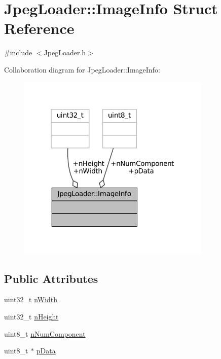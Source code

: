 \hypertarget{structJpegLoader_1_1ImageInfo}{}\section{Jpeg\+Loader\+::Image\+Info Struct Reference}
\label{structJpegLoader_1_1ImageInfo}


{\ttfamily \#include $<$Jpeg\+Loader.\+h$>$}



Collaboration diagram for Jpeg\+Loader\+::Image\+Info\+:
\nopagebreak
\begin{figure}[H]
\begin{center}
\leavevmode
\includegraphics[width=262pt]{structJpegLoader_1_1ImageInfo__coll__graph}
\end{center}
\end{figure}
\subsection*{Public Attributes}
\begin{DoxyCompactItemize}
\item 
uint32\+\_\+t \mbox{\hyperlink{structJpegLoader_1_1ImageInfo_a1493d418b0e4f9fe6f2ca8bef6d90986}{n\+Width}}
\item 
uint32\+\_\+t \mbox{\hyperlink{structJpegLoader_1_1ImageInfo_a7098cd306e7bee68eec258e9c52b6d0a}{n\+Height}}
\item 
uint8\+\_\+t \mbox{\hyperlink{structJpegLoader_1_1ImageInfo_ac919c88a435007c69621b21ce8051389}{n\+Num\+Component}}
\item 
uint8\+\_\+t $\ast$ \mbox{\hyperlink{structJpegLoader_1_1ImageInfo_ab34777b5fdc4ab2b67ca9e2ca665a558}{p\+Data}}
\end{DoxyCompactItemize}


